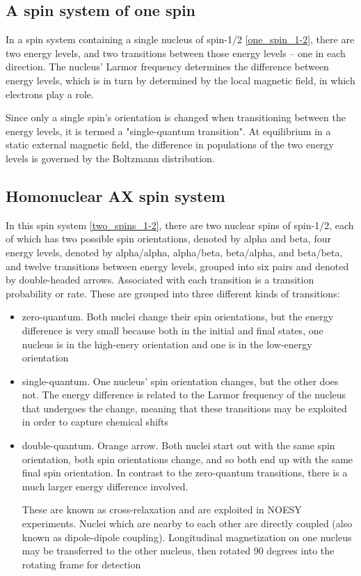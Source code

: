 \subsection*{A spin system of one spin}

In a spin system containing a single nucleus of spin-1/2 \ref{one_spin_1-2},
there are two energy levels, and two transitions between those energy levels
-- one in each direction.  The nucleus' Larmor frequency determines the 
difference between energy levels, which is in turn by determined by the 
local magnetic field, in which electrons play a role.

Since only a single spin's orientation is changed when transitioning between
the energy levels, it is termed a "single-quantum transition".
At equilibrium in a static external magnetic field, the difference in 
populations of the two energy levels is governed by the Boltzmann distribution.


\subsection*{Homonuclear AX spin system}

In this spin system \ref{two_spins_1-2}, there are
two nuclear spins of spin-1/2, each of which has two possible spin orientations,
denoted by alpha and beta,
four energy levels, denoted by alpha/alpha, alpha/beta, beta/alpha, and beta/beta, and
twelve transitions between energy levels, grouped into six pairs and denoted
by double-headed arrows.  Associated with each transition is a transition
probability or rate.  These are grouped into three different kinds of transitions:

\begin{itemize} 
  \item zero-quantum.  Both nuclei change their spin orientations, 
     but the energy difference is very small because both in the initial and
     final states, one nucleus is in the high-enery orientation and one is in
     the low-energy orientation

  \item single-quantum.  One nucleus' spin orientation changes, but
     the other does not.  The energy difference is related to the Larmor frequency
     of the nucleus that undergoes the change, meaning that these transitions may
     be exploited in order to capture chemical shifts

  \item double-quantum.  Orange arrow.  Both nuclei start out with the same spin
     orientation, both spin orientations change, and so both end up with the
     same final spin orientation.  In contrast to the zero-quantum transitions,
     there is a much larger energy difference involved.

     These are known as cross-relaxation and are exploited in 
     NOESY experiments.  Nuclei which are nearby to each other are directly
     coupled (also known as dipole-dipole coupling).  Longitudinal magnetization
     on one nucleus may be transferred to the other nucleus, then rotated 90
     degrees into the rotating frame for detection
\end{itemize}
   
